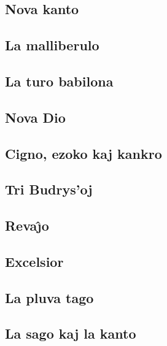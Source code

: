 \documentclass[a5paper,11pt,openany,twoside,leqno]{book}
\begin{document}
\subsection{Nova kanto}
\label{nova}


\subsection{La malliberulo}
\label{malliberulo}


\subsection{La turo babilona}
\label{turo}

\subsection{Nova Dio}
\label{novadio}


\newpage %

\subsection{Cigno, ezoko kaj kankro}
\label{cigno}


\subsection{Tri Budrys'oj}
\label{tri}


\subsection{Reva\^{\j}o}
\label{revajxo}


\vspace*{-5ex} %

\subsection{Excelsior}
\label{excelsior}

\subsection{La pluva tago}
\label{pluva}

\subsection{La sago kaj la kanto}
\label{sago}

\end{document}
